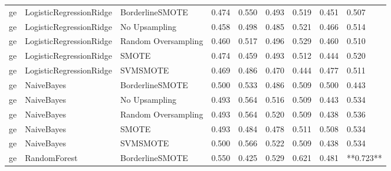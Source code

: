 \begin{tabular}{lllllllll}
      ge &      LogisticRegressionRidge &     BorderlineSMOTE & 0.474 &                     0.550 &                 0.493 &                  0.519 &                                   0.451 &     0.507 \\
      ge &      LogisticRegressionRidge &       No Upsampling & 0.458 &                     0.498 &                 0.485 &                  0.521 &                                   0.466 &     0.514 \\
      ge &      LogisticRegressionRidge & Random Oversampling & 0.460 &                     0.517 &                 0.496 &                  0.529 &                                   0.460 &     0.510 \\
      ge &      LogisticRegressionRidge &               SMOTE & 0.474 &                     0.459 &                 0.493 &                  0.512 &                                   0.444 &     0.520 \\
      ge &      LogisticRegressionRidge &            SVMSMOTE & 0.469 &                     0.486 &                 0.470 &                  0.444 &                                   0.477 &     0.511 \\
      ge &                   NaiveBayes &     BorderlineSMOTE & 0.500 &                     0.533 &                 0.486 &                  0.509 &                                   0.500 &     0.443 \\
      ge &                   NaiveBayes &       No Upsampling & 0.493 &                     0.564 &                 0.516 &                  0.509 &                                   0.443 &     0.534 \\
      ge &                   NaiveBayes & Random Oversampling & 0.493 &                     0.564 &                 0.520 &                  0.509 &                                   0.438 &     0.536 \\
      ge &                   NaiveBayes &               SMOTE & 0.493 &                     0.484 &                 0.478 &                  0.511 &                                   0.508 &     0.534 \\
      ge &                   NaiveBayes &            SVMSMOTE & 0.500 &                     0.566 &                 0.522 &                  0.509 &                                   0.438 &     0.534 \\
      ge &                 RandomForest &     BorderlineSMOTE & 0.550 &                     0.425 &                 0.529 &                  0.621 &                                   0.481 & **0.723** \\

\end{tabular}
